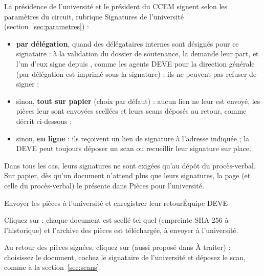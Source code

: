 \documentclass[11pt,a4paper]{article}
\begin{document}
La présidence de l'université et le président du CCEM signent selon les
paramètres du circuit, rubrique \og Signatures de l'université\fg{}
(section~\ref{sec:parametres}) :
\begin{itemize}
  \item \textbf{par délégation}, quand des délégataires internes sont
        désignés pour ce signataire : à la validation du dossier de
        soutenance, la demande leur part, et l'un d'eux signe depuis
        , comme les agents DEVE pour la direction
        générale (\og par délégation\fg{} est imprimé sous la signature) ;
        ils ne peuvent pas refuser de signer ;
  \item sinon, \textbf{tout sur papier} (choix par défaut) : aucun lien ne
        leur est envoyé, les pièces leur sont envoyées scellées et leurs scans
        déposés au retour, comme décrit ci-dessous ;
  \item sinon, \textbf{en ligne} : ils reçoivent un lien de signature à
        l'adresse indiquée ; la DEVE peut toujours déposer un scan ou
        recueillir leur signature sur place.
\end{itemize}

Dans tous les cas, leurs signatures ne sont exigées qu'au dépôt du
procès-verbal. Sur papier, dès qu'un document n'attend plus que leurs
signatures, la page  (et celle du
procès-verbal) le présente dans \og Pièces pour l'université\fg{}.

\begin{procedure}{Envoyer les pièces à l'université et enregistrer leur retour}{Équipe DEVE}
\begin{etapes}
  \item Cliquez sur  :
        chaque document est scellé tel quel (empreinte SHA-256 à l'historique)
        et l'archive des pièces est téléchargée, à envoyer à l'université.
  \item Au retour des pièces signées, cliquez sur  (aussi proposé dans \og À traiter\fg{}) :
        choisissez le document, cochez le signataire de l'université et déposez
        le scan, comme à la section~\ref{sec:scans}.
\end{etapes}
\end{procedure}
\end{document}
